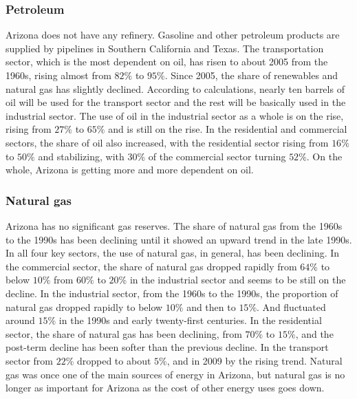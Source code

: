 \documentclass{mcmthesis}
\begin{document}
\subsubsection{Petroleum}
  Arizona does not have any refinery. Gasoline and other petroleum products are supplied by pipelines in Southern California and Texas.
  The transportation sector, which is the most dependent on oil, has risen to about 2005 from the 1960s, rising almost from $82\%$ to $95\%$.
  Since 2005, the share of renewables and natural gas has slightly declined. According to calculations, nearly ten barrels of oil will be
  used for the transport sector and the rest will be basically used in the industrial sector. The use of oil in the industrial sector
  as a whole is on the rise, rising from $27\%$ to $65\%$ and is still on the rise. In the residential and commercial sectors, the share of
  oil also increased, with the residential sector rising from $16\%$ to $50\%$ and stabilizing, with $30\%$ of the commercial sector turning $52\%$.
  On the whole, Arizona is getting more and more dependent on oil.
\subsubsection{Natural gas}
  Arizona has no significant gas reserves. The share of natural gas from the 1960s to the 1990s has been declining until it showed an upward
  trend in the late 1990s. In all four key sectors, the use of natural gas, in general, has been declining. In the commercial sector, the
  share of natural gas dropped rapidly from $64\%$ to below $10\%$ from $60\%$ to $20\%$ in the industrial sector and seems to be still on the decline.
  In the industrial sector, from the 1960s to the 1990s, the proportion of natural gas dropped rapidly to below $10\%$ and then to $15\%$.
  And fluctuated around $15\%$ in the 1990s and early twenty-first centuries. In the residential sector, the share of natural gas has been declining,
  from $70\%$ to $15\%$, and the post-term decline has been softer than the previous decline. In the transport sector from
  $22\%$ dropped to about $5\%$, and in 2009 by the rising trend. Natural gas was once one of the main sources of energy in Arizona, but natural
  gas is no longer as important for Arizona as the cost of other energy uses goes down.
\end{document}
